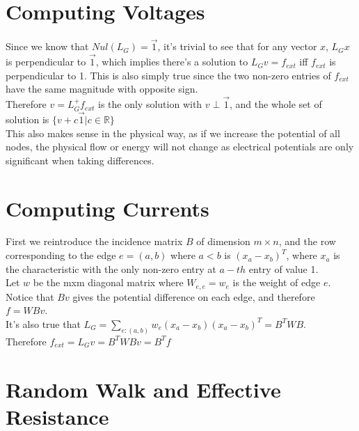 \documentclass[12pt]{article}
\begin{document}
\section{Computing Voltages}
Since we know that $Nul(L_G) = \vec{1}$, it's trivial to see that for any vector $x$, $L_G x$ is perpendicular to $\vec{1}$, which implies there's a solution to $L_Gv = f_{ext}$ iff $f_{ext}$ is perpendicular to 1. This is also simply true since the two non-zero entries of $f_{ext}$ have the same magnitude with opposite sign.\\
\newline
Therefore $v = L_{G}^+ f_{ext}$ is the only solution with $v \perp \vec{1}$, and the whole set of solution is $\{v + c\vec{1} | c\in \mathbb{R}\}$ \\
\newline
This also makes sense in the physical way, as if we increase the potential of all nodes, the physical flow or energy will not change as electrical potentials are only significant when taking differences.

\section{Computing Currents}
First we reintroduce the incidence matrix $B$ of dimension $m \times n$, and the row corresponding to the edge $e = (a, b)$ where $a < b$ is $(x_a - x_b)^T$, where $x_a$ is the characteristic with the only non-zero entry at $a-th$ entry of value 1.\\
\newline
Let $w$ be the mxm diagonal matrix where $W_{e, e} = w_e$ is the weight of edge $e$.\\
\newline
Notice that $Bv$ gives the potential difference on each edge, and therefore $f = WBv$.\\
\newline
It's also true that $L _ { G } = \sum _ { e : ( a , b ) } w _ { e } \left( x _ { a } - x _ { b } \right) \left( x _ { a } - x _ { b } \right) ^ { T } = B ^ { T } W B$. \\
\newline Therefore $f _ { e x t } = L _ { G } v = B ^ { T } W B v = B ^ { T } f$


\section{Random Walk and Effective Resistance}
\end{document}
